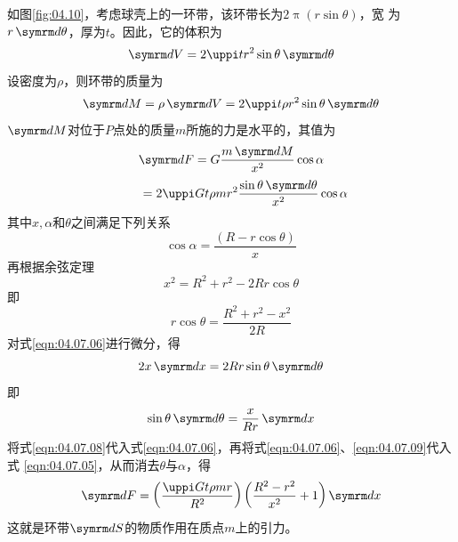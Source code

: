 如图\ref{fig:04.10}，考虑球壳上的一环带，该环带长为$ 2 \uppi \left( r \sin \theta \right) $，宽
为$ r \dif \theta $，厚为$ t $。因此，它的体积为
\begin{equation*}
  \dif V = 2 \uppi t r ^ { 2 } \sin \theta \dif \theta
\end{equation*}
设密度为$ \rho $，则环带的质量为
\begin{equation*}
  \dif M = \rho \dif V = 2 \uppi t \rho r ^ { 2 } \sin \theta \dif \theta
\end{equation*}
$ \dif M $对位于$ P $点处的质量$ m $所施的力是水平的，其值为
\begin{equation*}
  \dif F = G \frac { m \dif M } { x ^ { 2 } } \cos \alpha \\
\end{equation*}
\begin{equation}\label{eqn:04.07.05}
  \mbox{} \qquad = 2 \uppi G t \rho m r ^ { 2 } \frac { \sin \theta \dif \theta } { x ^ { 2 } } \cos \alpha
\end{equation}
其中$ x , \alpha $和$ \theta $之间满足下列关系
\begin{equation}\label{eqn:04.07.06}
  \cos \alpha = \frac { \left( R - r \cos \theta \right) } { x }
\end{equation}
再根据余弦定理
\begin{equation}\label{eqn:04.07.07}
  x ^ { 2 } = R ^ { 2 } + r ^ { 2 } - 2 R r \cos \theta
\end{equation}
即\vspace{-1.56em}
\begin{equation}\label{eqn:04.07.08}
  r \cos \theta = \frac { R ^ { 2 } + r ^ { 2 } - x ^ { 2 } } { 2 R }
\end{equation}
对式\eqref{eqn:04.07.06}进行微分，得
\begin{equation*}
  2 x \dif x = 2 R r \sin \theta \dif \theta
\end{equation*}
即\vspace{-1.56em}
\begin{equation}\label{eqn:04.07.09}
  \sin \theta \dif \theta = \frac { x } { R r } \dif x
\end{equation}
将式\eqref{eqn:04.07.08}代入式\eqref{eqn:04.07.06}，再将式\eqref{eqn:04.07.06}、\eqref{eqn:04.07.09}代入式
\eqref{eqn:04.07.05}，从而消去$ \theta $与$ \alpha $，得
\begin{equation}\label{eqn:04.07.10}
  \dif F = \left( \frac { \uppi G t \rho m r } { R ^ { 2 } } \right) \left( \frac { R ^ { 2 } - r ^ { 2 } } { x ^ { 2 } } + 1 \right) \dif x
\end{equation}
这就是环带$ \dif S $的物质作用在质点$ m $上的引力。

